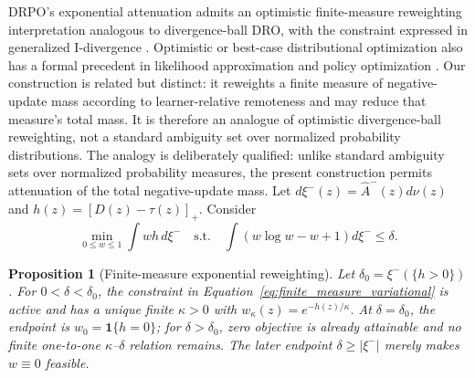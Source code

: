 \documentclass{article}
\theoremstyle{plain}
\newtheorem{proposition}[theorem]{Proposition}
\theoremstyle{definition}
\theoremstyle{remark}
\begin{document}
DRPO's exponential attenuation admits an optimistic finite-measure
reweighting interpretation analogous to divergence-ball DRO, with the
constraint expressed in generalized I-divergence
\citep{csiszar1975divergence}. Optimistic or best-case distributional
optimization also has a formal precedent in likelihood approximation
and policy optimization
\citep{nguyen2019optimistic,song2020optimistic}. Our construction is
related but distinct: it reweights a finite measure of negative-update
mass according to learner-relative remoteness and may reduce that
measure's total mass. It is therefore an analogue of optimistic
divergence-ball reweighting, not a standard ambiguity set over normalized
probability distributions. The analogy is deliberately qualified: unlike
standard ambiguity sets over normalized probability measures, the present
construction permits attenuation of the total negative-update mass. Let
\(d\xi^-(z)=\widehat A^-(z)d\nu(z)\) and
\(h(z)=[D(z)-\tau(z)]_+\). Consider
\begin{equation}
\min_{0\le w\le1}\int wh\,d\xi^-
\quad\mathrm{s.t.}\quad
\int(w\log w-w+1)d\xi^-\le\delta.
\label{eq:finite_measure_variational}
\end{equation}

\begin{proposition}[Finite-measure exponential reweighting]
\label{prop:finite_measure_variational}
Let \(\delta_0=\xi^-(\{h>0\})\). For
\(0<\delta<\delta_0\), the constraint in
Equation~\eqref{eq:finite_measure_variational} is active and has a unique
finite \(\kappa>0\) with
\(w_\kappa(z)=e^{-h(z)/\kappa}\). At \(\delta=\delta_0\), the endpoint is
\(w_0=\mathbf1\{h=0\}\); for \(\delta>\delta_0\), zero objective is
already attainable and no finite one-to-one \(\kappa\)--\(\delta\)
relation remains. The later endpoint \(\delta\ge|\xi^-|\) merely makes
\(w\equiv0\) feasible.
\end{proposition}
\end{document}
